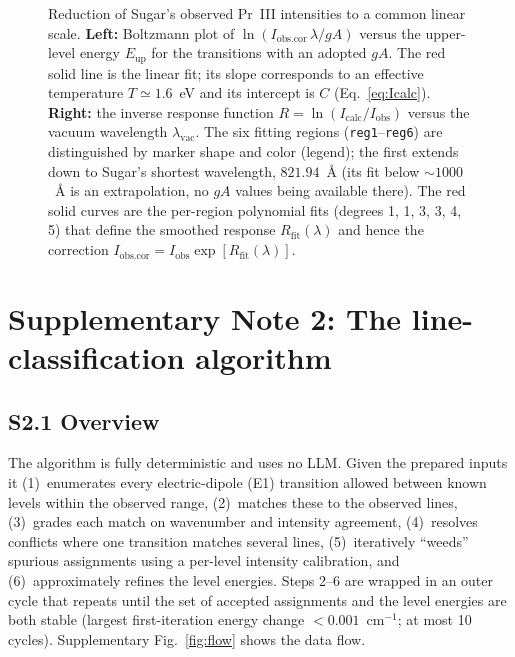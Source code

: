 \documentclass[10pt]{article}
\begin{document}
\begin{figure}[t]
  \centering
  
  \caption{Reduction of Sugar's observed Pr~III intensities to a common linear
  scale. \textbf{Left:} Boltzmann plot of
  $\ln(I_{\mathrm{obs.cor}}\,\lambda/gA)$ versus the upper-level energy
  $E_{\mathrm{up}}$ for the transitions with an adopted $gA$. The red solid
  line is the linear fit; its slope corresponds to an effective temperature
  $T\simeq1.6$~eV and its intercept is $C$ (Eq.~\eqref{eq:Icalc}).
  \textbf{Right:} the inverse response function
  $R=\ln(I_{\mathrm{calc}}/I_{\mathrm{obs}})$ versus the vacuum wavelength
  $\lambda_{\mathrm{vac}}$. The six fitting regions
  (\texttt{reg1}--\texttt{reg6}) are distinguished by marker shape and color
  (legend); the first extends down to Sugar's shortest wavelength,
  $821.94$~\AA{} (its fit below ${\sim}1000$~\AA{} is an extrapolation, no $gA$
  values being available there). The red solid curves are the per-region
  polynomial fits
  (degrees 1, 1, 3, 3, 4, 5) that
  define the smoothed response $R_{\mathrm{fit}}(\lambda)$ and hence the
  correction $I_{\mathrm{obs.cor}} = I_{\mathrm{obs}}\exp[R_{\mathrm{fit}}(\lambda)]$.}
  \label{fig:intens}
\end{figure}


\section*{Supplementary Note 2: The line-classification algorithm}
\label{sn:algorithm}

\subsection*{S2.1 Overview}
The algorithm is fully deterministic and uses no LLM. Given the prepared
inputs it (1)~enumerates every electric-dipole (E1) transition allowed
between known levels within the observed range, (2)~matches these to the
observed lines, (3)~grades each match on wavenumber and intensity
agreement, (4)~resolves conflicts where one transition matches several
lines, (5)~iteratively ``weeds'' spurious assignments using a per-level
intensity calibration, and (6)~approximately refines the level energies.
Steps 2--6 are wrapped in an outer cycle that repeats until the set of
accepted assignments and the level energies are both stable (largest
first-iteration energy change $< 0.001$~cm$^{-1}$; at most 10 cycles).
Supplementary Fig.~\ref{fig:flow} shows the data flow.
\end{document}
